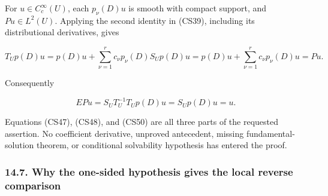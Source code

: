 \documentclass[
  11pt,
]{article}
\makeatletter
\let\ReaderOriginalAnchorStart\hyper@anchorstart
\let\ReaderOriginalAnchorEnd\hyper@anchorend
\let\ReaderPendingAliases\@empty
\def\ReaderArmAliases#1{\gdef\ReaderPendingAliases{#1}}
\def\hyper@anchorstart#1{\ReaderIfNativeAnchorTF{#1}{\ReaderPendingAliases\global\let\ReaderPendingAliases\@empty}{}\ReaderOriginalAnchorStart{#1}}
\makeatother
\begin{document}
For \(u\in C_c^\infty(U)\), each \(p_\nu(D)u\) is smooth with compact
support, and \(Pu\in L^2(U)\). Applying the second identity in (CS39),
including its distributional derivatives, gives

\[
 T_Up(D)u
  =p(D)u+\sum_{\nu=1}^r c_\nu p_\nu(D)S_Up(D)u
  =p(D)u+\sum_{\nu=1}^r c_\nu p_\nu(D)u=Pu.                  \tag{CS49}
\]

Consequently

\[
 EPu=S_UT_U^{-1}T_Up(D)u=S_Up(D)u=u.                          \tag{CS50}
\]

Equations (CS47), (CS48), and (CS50) are all three parts of the
requested assertion. No coefficient derivative, unproved antecedent,
missing fundamental-solution theorem, or conditional solvability
hypothesis has entered the proof.

\ReaderArmAliases{\ReaderOriginalAnchorStart{why-the-one-sided-hypothesis-gives-the-local-reverse-comparison}\ReaderOriginalAnchorEnd}
\subsubsection{14.7. Why the one-sided hypothesis gives the local
reverse
comparison}\label{why-the-one-sided-hypothesis-gives-the-local-reverse-comparison}
\end{document}
